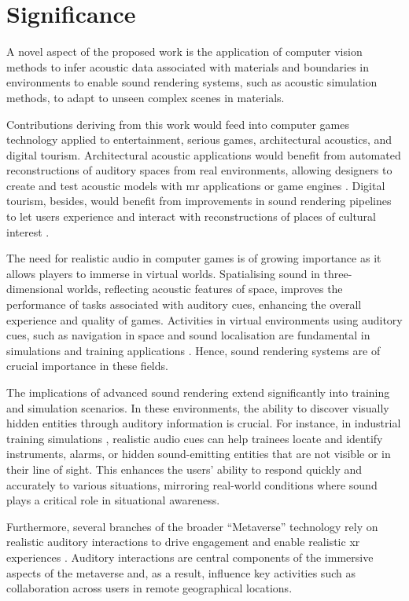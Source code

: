 \section{Significance}
A novel aspect of the proposed work is the application of computer vision methods to infer acoustic data associated with materials and boundaries in environments to enable sound rendering systems, such as acoustic simulation methods, to adapt to unseen complex scenes in materials.\par
Contributions deriving from this work would feed into computer games technology applied to entertainment, serious games, architectural acoustics, and digital tourism. Architectural acoustic applications would benefit from automated reconstructions of auditory spaces from real environments, allowing designers to create and test acoustic models with \acrshort{mr} applications or game engines \citep{berardi2016acoustic}. Digital tourism, besides, would benefit from improvements in sound rendering pipelines to let users experience and interact with reconstructions of places of cultural interest \citep{schofield2018viking}.\par
The need for realistic audio in computer games is of growing importance as it allows players to immerse in virtual worlds. Spatialising sound in three-dimensional worlds, reflecting acoustic features of space, improves the performance of tasks associated with auditory cues, enhancing the overall experience and quality of games. Activities in virtual environments using auditory cues, such as navigation in space and sound localisation are fundamental in simulations and training applications \citep{lokki2005navigation}. Hence, sound rendering systems are of crucial importance in these fields.\par
The implications of advanced sound rendering extend significantly into training and simulation scenarios. In these environments, the ability to discover visually hidden entities through auditory information is crucial. For instance, in industrial training simulations \citep{machala2022application}, realistic audio cues can help trainees locate and identify instruments, alarms, or hidden sound-emitting entities that are not visible or in their line of sight. This enhances the users' ability to respond quickly and accurately to various situations, mirroring real-world conditions where sound plays a critical role in situational awareness.\par
Furthermore, several branches of the broader ``Metaverse'' technology rely on realistic auditory interactions to drive engagement and enable realistic \acrshort{xr} experiences \citep{park2022metaverse,al2022review}. Auditory interactions are central components of the immersive aspects of the metaverse and, as a result, influence key activities such as collaboration across users in remote geographical locations.\par

